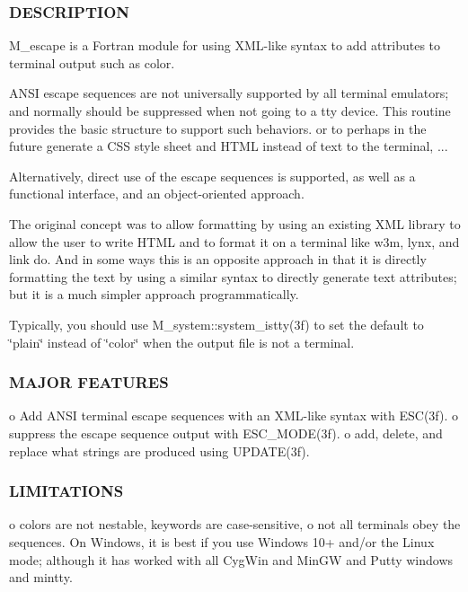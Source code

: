 \subsubsection*{D\+E\+S\+C\+R\+I\+P\+T\+I\+ON}

M\+\_\+escape is a Fortran module for using X\+M\+L-\/like syntax to add attributes to terminal output such as color.

A\+N\+SI escape sequences are not universally supported by all terminal emulators; and normally should be suppressed when not going to a tty device. This routine provides the basic structure to support such behaviors. or to perhaps in the future generate a C\+SS style sheet and H\+T\+ML instead of text to the terminal, ...

Alternatively, direct use of the escape sequences is supported, as well as a functional interface, and an object-\/oriented approach.

The original concept was to allow formatting by using an existing X\+ML library to allow the user to write H\+T\+ML and to format it on a terminal like w3m, lynx, and link do. And in some ways this is an opposite approach in that it is directly formatting the text by using a similar syntax to directly generate text attributes; but it is a much simpler approach programmatically.

Typically, you should use M\+\_\+system\+::system\+\_\+istty(3f) to set the default to \char`\"{}plain\char`\"{} instead of \char`\"{}color\char`\"{} when the output file is not a terminal.

\subsubsection*{M\+A\+J\+OR F\+E\+A\+T\+U\+R\+ES}

o Add A\+N\+SI terminal escape sequences with an X\+M\+L-\/like syntax with E\+S\+C(3f). o suppress the escape sequence output with E\+S\+C\+\_\+\+M\+O\+D\+E(3f). o add, delete, and replace what strings are produced using U\+P\+D\+A\+T\+E(3f).

\subsubsection*{L\+I\+M\+I\+T\+A\+T\+I\+O\+NS}

o colors are not nestable, keywords are case-\/sensitive, o not all terminals obey the sequences. On Windows, it is best if you use Windows 10+ and/or the Linux mode; although it has worked with all Cyg\+Win and Min\+GW and Putty windows and mintty.

